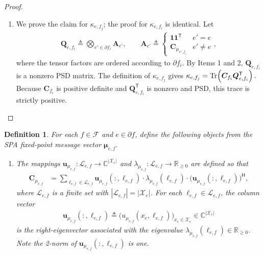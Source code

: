 \documentclass[journal]{IEEEtran}
\newcommand{\add}[1]{{\color{black}#1}}
\newtheorem{definition}[theorem]{Definition}
\newcommand{\vect}[1]{ \bm{#1} }
\newcommand{\set}[1]{\mathcal{#1}}
\newcommand{\setF}{ \mathcal{F} }
\newcommand{\setpf}{ \partial f }
\newcommand{\sR}{\mathbb{R}}
\newcommand{\sC}{\mathbb{C}}
\newcommand{\Herm}{\mathsf{H}}
\newcommand{\tran}{\mathsf{T}}
\newcommand{\xe}{ x_{e} }
\newcommand{\setxe}{ \mathcal{X}_{e} }
\newcommand{\vmu}{ \vect{ \mu } }
\newcommand{\defeq}{ \triangleq }
\newcommand{\etof}{ e,f }
\newcommand{\matr}[1]{\vect{#1}}
\newcommand{\setpfi}{ \partial f_{i} }
\begin{document}
\begin{appendices}
\begin{proof}
\begin{enumerate}
      \item We prove the claim for $\kappa_{e,f_j}$; the proof for
            $\kappa_{e,f_i}$ is identical. Let
            \begin{align*}
              \matr{Q}_{e,f_i}
              \defeq \bigotimes_{e'\in\setpfi}\matr{A}_{e'},
              \qquad
              \matr{A}_{e'} \defeq
              \begin{cases}
                \bm{1}\bm{1}^{\tran}    & e'=e     \\
                \matr{C}_{\mu_{e',f_i}} & e'\neq e
              \end{cases},
            \end{align*}
            where the tensor factors are ordered according to $\setpfi$. By Items 1 and 2,
            $\matr{Q}_{e,f_i}$ is a nonzero PSD matrix. The definition of
            $\kappa_{e,f_j}$ gives
            $
              \kappa_{e,f_j}
              = \Tr\!\left(\matr{C}_{f_i}\matr{Q}_{e,f_i}^{\tran}\right).
            $
            Because $\matr{C}_{f_i}$ is positive definite and
            $\matr{Q}_{e,f_i}^{\tran}$ is nonzero and PSD, this trace is
            strictly positive.\qedhere
    \end{enumerate}
  \end{proof}

  \begin{definition}
    \label{def: def of eig of mu ef}
    \add{For each $ f \in \setF $ and $ e \in \setpf $, define the following
      objects from the SPA fixed-point message vector $ \vmu_{\etof} $.}
    \begin{enumerate}
      \item The mappings
            $\matr{u}_{ \mu_{\etof} }: \set{L}_{e,f} \to \sC^{|\setxe|}$ and
            $\lambda_{\mu_{\etof}}: \set{L}_{e,f} \to \sR_{\geq 0}$ \add{are defined
              so that}
            \begin{align}
              \matr{C}_{\mu_{\etof}}
               & =  \!\!\! \sum_{ \ell_{e,f} \in \set{L}_{e,f} }
              \!\!\!\!\!\!
              \matr{u}_{ \mu_{\etof} }( :, \ell_{e,f} )
              \cdot \lambda_{ \mu_{\etof} }(\ell_{e,f} ) \cdot \bigl( \matr{u}_{ \mu_{\etof} }(:, \ell_{e,f} ) \bigr)^{\!\Herm},
              \label{eqn: decomposition of the Choi matrix for SPA message}
            \end{align}
            where $ \set{L}_{e,f} $ is a finite set with $ |\set{L}_{e,f}| = |\setxe| $.
            \add{For each $ \ell_{e,f} \in \set{L}_{e,f} $, the column vector}
            \begin{align*}
              \matr{u}_{ \mu_{\etof} }( :, \ell_{e,f} )
              \defeq \bigl( u_{ \mu_{\etof} }( \xe, \ell_{e,f} )
              \bigr)_{ \! \xe \in \setxe } \in \sC^{|\setxe|}
            \end{align*}
            is the right-eigenvector associated with the eigenvalue
            $ \lambda_{ \mu_{\etof} }( \ell_{e,f} ) \in \sR_{\geq 0} $. Note
            the 2-norm of $\matr{u}_{ \mu_{\etof} }( :, \ell_{e,f} )$ is one.


\end{enumerate}
\end{definition}
\end{appendices}
\end{document}
